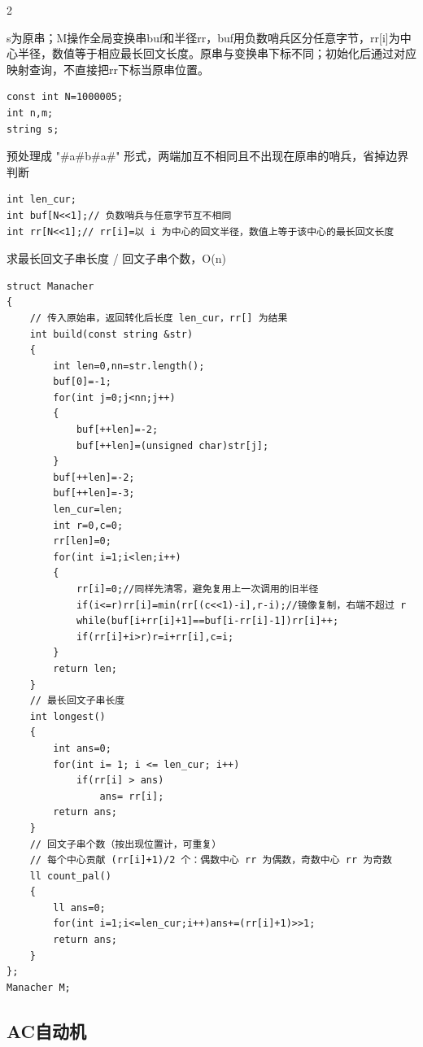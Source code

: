 \documentclass[UTF8,fontset=fandol,a4paper,twoside]{ctexart}
\newcommand{\note}[1]{{\fontsize{10}{12}\selectfont #1\par}}
\begin{document}
\begin{multicols}{2}
\note{s为原串；M操作全局变换串buf和半径rr，buf用负数哨兵区分任意字节，rr[\allowbreak{}i]\allowbreak{}为中心半径，数值等于相应最长回文长度。原串与变换串下标不同；初始化后通过对应映射查询，不直接把rr下标当原串位置。}
\begin{lstlisting}
const int N=1000005;
int n,m;
string s;
\end{lstlisting}
\note{预处理成 "\#a\#b\#a\#" 形式，两端加互不相同且不出现在原串的哨兵，省掉边界判断}
\begin{lstlisting}
int len_cur;
int buf[N<<1];// 负数哨兵与任意字节互不相同
int rr[N<<1];// rr[i]=以 i 为中心的回文半径，数值上等于该中心的最长回文长度
\end{lstlisting}
\note{求最长回文子串长度 /\allowbreak{} 回文子串个数，O(\allowbreak{}n)\allowbreak{}}
\begin{lstlisting}
struct Manacher
{
    // 传入原始串，返回转化后长度 len_cur，rr[] 为结果
    int build(const string &str)
    {
        int len=0,nn=str.length();
        buf[0]=-1;
        for(int j=0;j<nn;j++)
        {
            buf[++len]=-2;
            buf[++len]=(unsigned char)str[j];
        }
        buf[++len]=-2;
        buf[++len]=-3;
        len_cur=len;
        int r=0,c=0;
        rr[len]=0;
        for(int i=1;i<len;i++)
        {
            rr[i]=0;//同样先清零，避免复用上一次调用的旧半径
            if(i<=r)rr[i]=min(rr[(c<<1)-i],r-i);//镜像复制，右端不超过 r
            while(buf[i+rr[i]+1]==buf[i-rr[i]-1])rr[i]++;
            if(rr[i]+i>r)r=i+rr[i],c=i;
        }
        return len;
    }
    // 最长回文子串长度
    int longest()
    {
        int ans=0;
        for(int i= 1; i <= len_cur; i++)
            if(rr[i] > ans)
                ans= rr[i];
        return ans;
    }
    // 回文子串个数（按出现位置计，可重复）
    // 每个中心贡献 (rr[i]+1)/2 个：偶数中心 rr 为偶数，奇数中心 rr 为奇数
    ll count_pal()
    {
        ll ans=0;
        for(int i=1;i<=len_cur;i++)ans+=(rr[i]+1)>>1;
        return ans;
    }
};
Manacher M;
\end{lstlisting}
\subsection{AC自动机}


\end{multicols}
\end{document}

